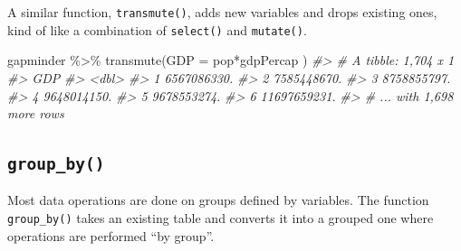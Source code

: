 \documentclass[
]{book}
\newenvironment{Shaded}{\begin{snugshade}}{\end{snugshade}}
\newcommand{\AttributeTok}[1]{\textcolor[rgb]{0.77,0.63,0.00}{#1}}
\newcommand{\CommentTok}[1]{\textcolor[rgb]{0.56,0.35,0.01}{\textit{#1}}}
\newcommand{\FunctionTok}[1]{\textcolor[rgb]{0.00,0.00,0.00}{#1}}
\newcommand{\NormalTok}[1]{#1}
\newcommand{\SpecialCharTok}[1]{\textcolor[rgb]{0.00,0.00,0.00}{#1}}
\begin{document}
A similar function, \texttt{transmute()}, adds new variables and drops existing ones, kind of like a combination of \texttt{select()} and \texttt{mutate()}.

\begin{Shaded}
\begin{Highlighting}[]
\NormalTok{gapminder }\SpecialCharTok{\%\textgreater{}\%} \FunctionTok{transmute}\NormalTok{(}\AttributeTok{GDP =}\NormalTok{ pop}\SpecialCharTok{*}\NormalTok{gdpPercap )}
\CommentTok{\#\textgreater{} \# A tibble: 1,704 x 1}
\CommentTok{\#\textgreater{}            GDP}
\CommentTok{\#\textgreater{}          \textless{}dbl\textgreater{}}
\CommentTok{\#\textgreater{} 1  6567086330.}
\CommentTok{\#\textgreater{} 2  7585448670.}
\CommentTok{\#\textgreater{} 3  8758855797.}
\CommentTok{\#\textgreater{} 4  9648014150.}
\CommentTok{\#\textgreater{} 5  9678553274.}
\CommentTok{\#\textgreater{} 6 11697659231.}
\CommentTok{\#\textgreater{} \# ... with 1,698 more rows}
\end{Highlighting}
\end{Shaded}

\hypertarget{group_by}{%
\subsection*{\texorpdfstring{\texttt{group\_by()}}{group\_by()}}\label{group_by}}

Most data operations are done on groups defined by variables. The function \texttt{group\_by()} takes an existing table and converts it into a grouped one where operations are performed ``by group''.
\end{document}
